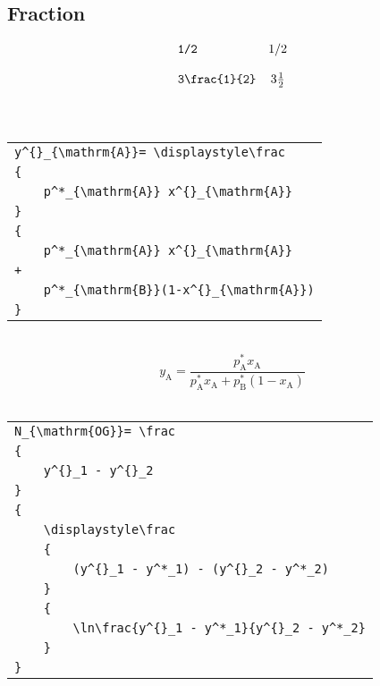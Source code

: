 \documentclass[a4paper]{report}
\begin{document}
\subsection{Fraction}
\begin{displaymath}
\begin{array}{l c}
\verb|1/2| & 1/2\\\\
\verb|3\frac{1}{2}| & 3\frac{1}{2}\\\\
\end{array}
\end{displaymath}\\

\begin{tabular}{|l|}
\hline

\verb|y^{}_{\mathrm{A}}= \displaystyle\frac| \\
\verb|{|\\
\verb|    p^*_{\mathrm{A}} x^{}_{\mathrm{A}}| \\
\verb|}| \\
\verb|{| \\
\verb|    p^*_{\mathrm{A}} x^{}_{\mathrm{A}}| \\
\verb|+| \\
\verb|    p^*_{\mathrm{B}}(1-x^{}_{\mathrm{A}})| \\
\verb|}| \\
\hline
\end{tabular}\\

\begin{displaymath}
y^{}_{\mathrm{A}}= \displaystyle\frac
{
    p^*_{\mathrm{A}} x^{}_{\mathrm{A}}
}
{
    p^*_{\mathrm{A}} x^{}_{\mathrm{A}}
+
    p^*_{\mathrm{B}}(1-x^{}_{\mathrm{A}})
}
\end{displaymath}\\

\begin{tabular}{|l| }
\cline{1-1}
\verb|N_{\mathrm{OG}}= \frac| \\
\verb|{| \\
\verb|    y^{}_1 - y^{}_2| \\
\verb|}| \\
\verb|{| \\
\verb|    \displaystyle\frac| \\
\verb|    {| \\
\verb|        (y^{}_1 - y^*_1) - (y^{}_2 - y^*_2)| \\
\verb|    }| \\
\verb|    {| \\
\verb|        \ln\frac{y^{}_1 - y^*_1}{y^{}_2 - y^*_2}| \\
\verb|    }| \\
\verb|}| \\
\cline{1-1}
\end{tabular}
\\
\end{document}
